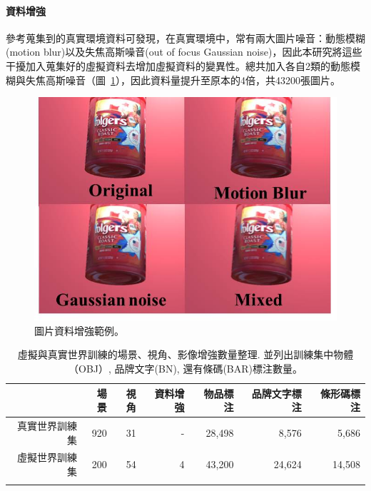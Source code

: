 \paragraph{資料增強}
參考蒐集到的真實環境資料可發現，在真實環境中，常有兩大圖片噪音：動態模糊(motion blur)以及失焦高斯噪音(out of focus Gaussian noise)，因此本研究將這些干擾加入蒐集好的虛擬資料去增加虛擬資料的變異性。總共加入各自2類的動態模糊與失焦高斯噪音（圖~\ref{figure:image_augu}），因此資料量提升至原本的4倍，共43200張圖片。

\begin{figure}[H]
	\centering
	\includegraphics[height=!, width=1.0\linewidth, keepaspectratio=true]
	{./figures/image_augu.jpg}
  \caption{圖片資料增強範例。}
  \label{figure:image_augu}
\end{figure}

\begin{table}[H]
\caption{虛擬與真實世界訓練的場景、視角、影像增強數量整理. 並列出訓練集中物體（OBJ）, 品牌文字(BN), 還有條碼(BAR)標注數量。}
\centering
\begin{tabular}{rrrr|rrr}
\hline
         & 場景 & 視角 & 資料增強 & 物品標注       & 品牌文字標注       & 條形碼標注 \\ \hline
真實世界訓練集 	& 920   & 31   & -        & 28,498       & 8,576    & 5,686     \\
虛擬世界訓練集   	& 200   & 54   & 4      & 43,200       & 24,624         & 14,508          \\
\hline
\label{table:training_set_table}
\end{tabular}
\end{table}

